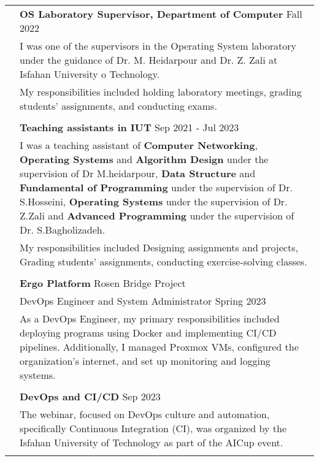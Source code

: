 \documentclass[letterpaper, 11pt]{article}
\begin{document}
\begin{longtable}{p{1.3in}p{4.8in}}
& \textbf{OS Laboratory Supervisor, Department of Computer} \hfill Fall 2022 \\
& I was one of the supervisors in the Operating System laboratory under the guidance of Dr. M. Heidarpour and Dr. Z. Zali at Isfahan University o Technology.\\
& My responsibilities included holding laboratory meetings, grading students' assignments, and conducting exams.\\
& \\

& \textbf{Teaching assistants in IUT} \hfill Sep 2021 - Jul 2023 \\
& I was a teaching assistant of \textbf{Computer Networking}, \textbf{Operating Systems} and \textbf{Algorithm Design} under the supervision of Dr M.heidarpour, \textbf{Data Structure} and \textbf{Fundamental of Programming} under the supervision of Dr. S.Hosseini, \textbf{Operating Systems} under the supervision of Dr. Z.Zali and \textbf{Advanced Programming} under the supervision of Dr. S.Bagholizadeh. \\
& My responsibilities included Designing assignments and projects, Grading students' assignments, conducting exercise-solving classes.\\
& \\


{\color{MidnightBlue}{Industry experience}} 
& {\textbf{Ergo Platform}} Rosen Bridge Project \hfill \\
& DevOps Engineer and System Administrator \hfill Spring 2023 \\
& As a DevOps Engineer, my primary responsibilities included deploying programs using Docker and implementing CI/CD pipelines. Additionally, I managed Proxmox VMs, configured the organization's internet, and set up monitoring and logging systems.\\
& \\
 

{\color{MidnightBlue}{Talks and tutorials}} 
& \textbf{DevOps and CI/CD} \hfill Sep 2023 \\
& The webinar, focused on DevOps culture and automation, specifically Continuous Integration (CI), was organized by the Isfahan University of Technology as part of the AICup event. \\
& \\


\end{longtable}
\end{document}
